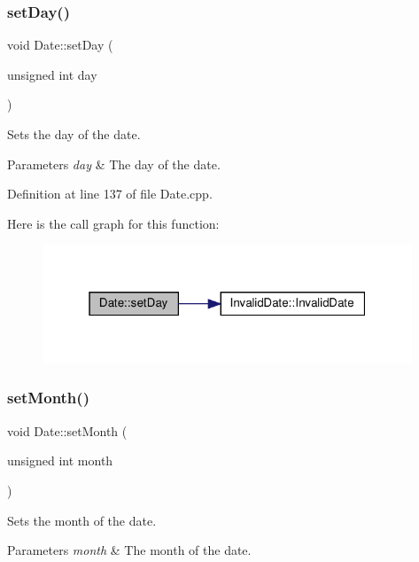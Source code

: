 \mbox{\label{classDate_a18dc2bd52ab8adcca331f66c27ed6623}} 
\subsubsection{\texorpdfstring{set\+Day()}{setDay()}}
{\footnotesize\ttfamily void Date\+::set\+Day (\begin{DoxyParamCaption}\item[{unsigned int}]{day }\end{DoxyParamCaption})}

Sets the day of the date. 
\begin{DoxyParams}{Parameters}
{\em day} & The day of the date. \\
\hline
\end{DoxyParams}


Definition at line 137 of file Date.\+cpp.

Here is the call graph for this function\+:\nopagebreak
\begin{figure}[H]
\begin{center}
\leavevmode
\includegraphics[width=313pt]{classDate_a18dc2bd52ab8adcca331f66c27ed6623_cgraph}
\end{center}
\end{figure}
\mbox{\label{classDate_aa83b79359070012ab58ff99abeb34340}} 
\subsubsection{\texorpdfstring{set\+Month()}{setMonth()}}
{\footnotesize\ttfamily void Date\+::set\+Month (\begin{DoxyParamCaption}\item[{unsigned int}]{month }\end{DoxyParamCaption})}

Sets the month of the date. 
\begin{DoxyParams}{Parameters}
{\em month} & The month of the date. \\
\hline
\end{DoxyParams}


